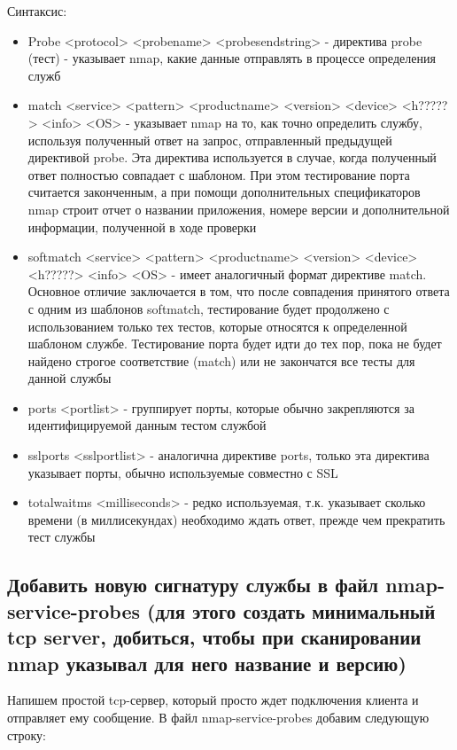 \documentclass[11pt, a4paper]{article}		%
\begin{document}
Синтаксис: 
\begin{itemize}
\item Probe <protocol> <probename> <probesendstring> - директива probe (тест) - указывает nmap, какие данные отправлять в процессе определения служб
\item match <service> <pattern> <productname> <version> <device> <h?????> <info> <OS> - указывает nmap на то, как точно определить службу, используя полученный ответ на запрос, отправленный предыдущей директивой probe. Эта директива используется в случае, когда полученный ответ полностью совпадает с шаблоном. При этом тестирование порта считается законченным, а при помощи дополнительных спецификаторов nmap строит отчет о названии приложения, номере версии и дополнительной информации, полученной в ходе проверки
\item softmatch <service> <pattern> <productname> <version> <device> <h?????> <info> <OS> - имеет аналогичный формат директиве match. Основное отличие заключается в том, что после совпадения принятого ответа с одним из шаблонов softmatch, тестирование будет продолжено с использованием только тех тестов, которые относятся к определенной шаблоном службе. Тестирование порта будет идти до тех пор, пока не будет найдено строгое соответствие (match) или не закончатся все тесты для данной службы
\item ports <portlist> - группирует порты, которые обычно закрепляются за идентифицируемой данным тестом службой
\item sslports <sslportlist> - аналогична директиве ports, только эта директива указывает порты, обычно используемые совместно с SSL
\item totalwaitms <milliseconds> - редко используемая, т.к. указывает сколько времени (в миллисекундах) необходимо ждать ответ, прежде чем прекратить тест службы
\end{itemize}


\subsection{Добавить новую сигнатуру службы в файл nmap-service-probes (для этого создать минимальный tcp server, добиться, чтобы при сканировании nmap указывал для него название и версию)}

Напишем простой tcp-сервер, который просто ждет подключения клиента и отправляет ему сообщение. В файл nmap-service-probes добавим следующую строку: 
\end{document}
